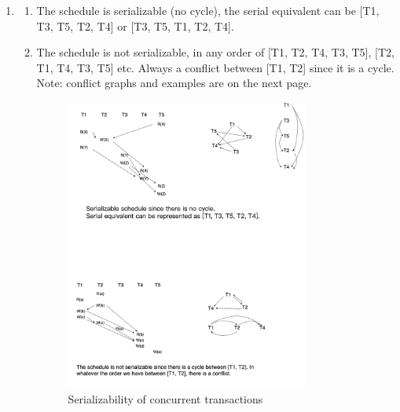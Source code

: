\documentclass[12pt]{extarticle}
\begin{document}
\begin{flushleft}
\begin{enumerate}
\begin{enumerate}
\end{enumerate}

\item

\begin{enumerate}

\item The schedule is serializable (no cycle), the serial equivalent can be [T1, T3, T5, T2, T4] or [T3, T5, T1, T2, T4].\\
\item The schedule is not serializable, in any order of [T1, T2, T4, T3, T5], [T2, T1, T4, T3, T5] etc. Always a conflict between [T1, T2] since it is a cycle. \\
Note: conflict graphs and examples are on the next page.

\begin{figure}[h]
  \centering
  \includegraphics[width=0.8\textwidth]{hw6_c.drawio.png}
  \caption{Serializability of concurrent transactions}
\end{figure}

\end{enumerate}

\end{enumerate}
\end{flushleft}
\end{document}
